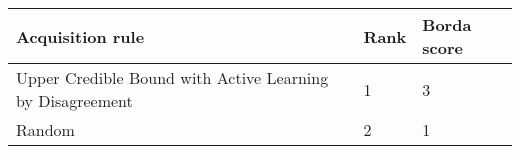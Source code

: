 \begin{tabular}{lll}
Acquisition rule & Rank & Borda score \\ 
\hline 
Upper Credible Bound with Active Learning by Disagreement & 1 & 3 \\ 
Random                                                    & 2 & 1 \\ 
\hline 
\end{tabular}